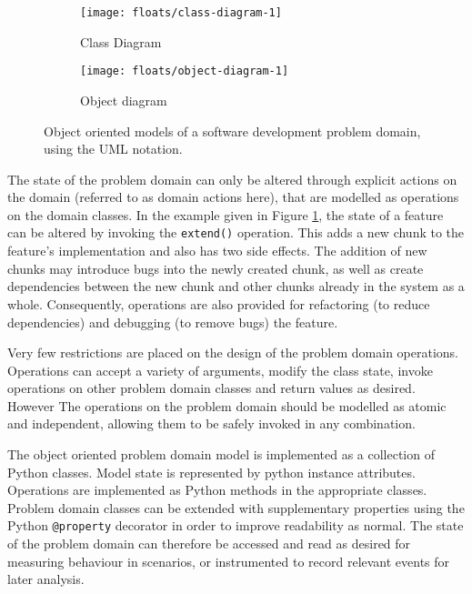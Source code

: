 \documentclass{sig-alternate}
\begin{document}
\begin{figure}
  \centering

  \begin{subfigure}{\linewidth}
    \centering
    \texttt{[image: floats/class-diagram-1]}
    \caption{Class Diagram}
    \label{fig:feature-class-diagram}
  \end{subfigure}

  \begin{subfigure}{\linewidth}
    \centering 
    \texttt{[image: floats/object-diagram-1]}
    \caption{Object diagram}
    \label{fig:feature-instance-diagram}
  
  \end{subfigure}

  
  \caption{Object oriented models of a software development problem domain,
    using the UML notation.}

\end{figure}

The state of the problem domain can only be altered through explicit actions on
the domain (referred to as domain actions here), that are modelled as operations
on the domain classes.  In the example given in Figure \ref{fig:feature-class-diagram},
the state of a feature can be altered by invoking the \lstinline!extend()!
operation.  This adds a new chunk to the feature's implementation and also has
two side effects. The addition of new chunks may introduce bugs into the newly
created chunk, as well as create dependencies between the new chunk and other
chunks already in the system as a whole.  Consequently, operations are also
provided for refactoring (to reduce dependencies) and debugging (to remove bugs)
the feature.

Very few restrictions are placed on the design of the problem domain operations.
Operations can accept a variety of arguments, modify the class state, invoke
operations on other problem domain classes and return values as desired.
However The operations on the problem domain should be modelled as atomic and
independent, allowing them to be safely invoked in any combination.

The object oriented problem domain model is implemented as a collection of
Python classes.  Model state is represented by python instance attributes.
Operations are implemented as Python methods in the appropriate classes.
Problem domain classes can be extended with supplementary properties using the
Python \lstinline!@property! decorator in order to improve readability as
normal.  The state of the problem domain can therefore be accessed and read as
desired for measuring behaviour in scenarios, or instrumented to record relevant
events for later analysis.
\end{document}
